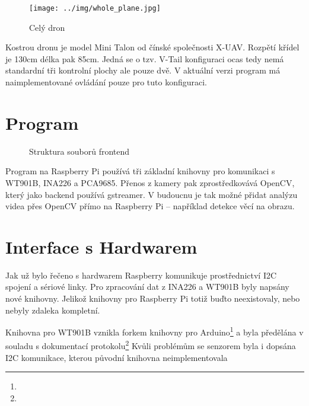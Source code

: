 \documentclass[a4paper,oneside,12pt]{report}
\begin{document}
\begin{figure}[h]
  \centering
  \texttt{[image: ../img/whole\_plane.jpg]}
  \caption[Celý dron]{Celý dron}
\end{figure}


Kostrou dronu je model Mini Talon od čínské společnosti X-UAV.
Rozpětí křídel je 130cm délka pak 85cm.
Jedná se o tzv. V-Tail konfiguraci ocas tedy nemá standardní tři kontrolní plochy ale pouze dvě.
V aktuální verzi program má naimplementované ovládání pouze pro tuto konfiguraci.

\newpage

\section{Program}

\begin{figure}[h]
  \caption[Struktura souborů na dronu, vlastní tvorba]{Struktura souborů frontend}
\end{figure}

Program na Raspberry Pi používá tři základní knihovny pro komunikaci s WT901B, INA226 a PCA9685.
Přenos z kamery pak zprostředkovává OpenCV, který jako backend používá gstreamer.
V budoucnu je tak možné přidat analýzu videa přes OpenCV přímo na Raspberry Pi -- například detekce věcí na obrazu.

\section{Interface s Hardwarem}

Jak už bylo řečeno s hardwarem Raspberry komunikuje prostřednictví I2C spojení a sériové linky.
Pro zpracování dat z INA226 a WT901B byly napsány nové knihovny.
Jelikož knihovny pro Raspberry Pi totiž buďto neexistovaly, nebo nebyly zdaleka kompletní.

Knihovna pro WT901B vznikla forkem knihovny pro Arduino\footnote{} a byla předělána v souladu s dokumentací protokolu\footnote{}
Kvůli problémům se senzorem byla i dopsána I2C komunikace, kterou původní knihovna neimplementovala
\end{document}
